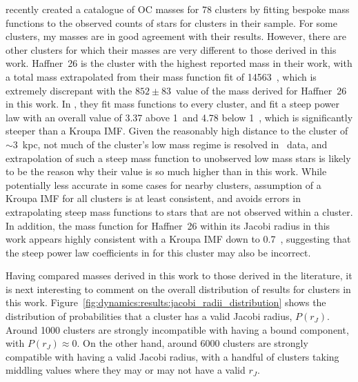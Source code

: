 \cite{cordoni_photometric_binaries_2023} recently created a catalogue of OC masses for 78 clusters by fitting bespoke mass functions to the observed counts of stars for clusters in their sample. For some clusters, my masses are in good agreement with their results. However, there are other clusters for which their masses are very different to those derived in this work. Haffner~26 is the cluster with the highest reported mass in their work, with a total mass extrapolated from their mass function fit of 14563~\MSun, which is extremely discrepant with the $852\pm83$~\MSun value of the mass derived for Haffner~26 in this work. In \cite{cordoni_photometric_binaries_2023}, they fit mass functions to every cluster, and fit a steep power law with an overall value of 3.37 above 1~\MSun and 4.78 below 1~\MSun, which is significantly steeper than a Kroupa IMF. Given the reasonably high distance to the cluster of $\sim 3$~kpc, not much of the cluster's low mass regime is resolved in \gaia\ data, and extrapolation of such a steep mass function to unobserved low mass stars is likely to be the reason why their value is so much higher than in this work. While potentially less accurate in some cases for nearby clusters, assumption of a Kroupa IMF for all clusters is at least consistent, and avoids errors in extrapolating steep mass functions to stars that are not observed within a cluster. In addition, the mass function for Haffner~26 within its Jacobi radius in this work appears highly consistent with a Kroupa IMF down to 0.7~\MSun, suggesting that the steep power law coefficients in \cite{cordoni_photometric_binaries_2023} for this cluster may also be incorrect.

Having compared masses derived in this work to those derived in the literature, it is next interesting to comment on the overall distribution of results for clusters in this work. Figure~\ref{fig:dynamics:results:jacobi_radii_distribution} shows the distribution of probabilities that a cluster has a valid Jacobi radius, $P(r_J)$. Around 1000 clusters are strongly incompatible with having a bound component, with $P(r_J)\approx0$. On the other hand, around 6000 clusters are strongly compatible with having a valid Jacobi radius, with a handful of clusters taking middling values where they may or may not have a valid $r_J$.


